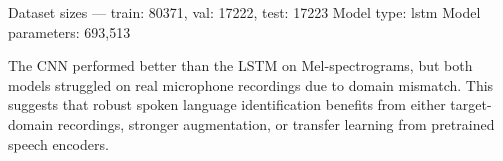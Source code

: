 Dataset sizes — train: 80371, val: 17222, test: 17223
Model type: lstm
Model parameters: 693,513


The CNN performed better than the LSTM on Mel-spectrograms, but both models struggled on real microphone recordings due to domain mismatch. This suggests that robust spoken language identification benefits from either target-domain recordings, stronger augmentation, or transfer learning from pretrained speech encoders.